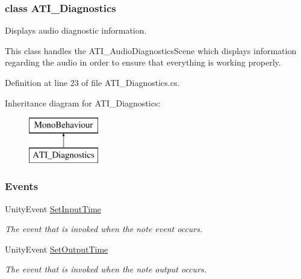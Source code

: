 \subsubsection{class A\+T\+I\+\_\+\+Diagnostics}
Displays audio diagnostic information. 

This class handles the A\+T\+I\+\_\+\+Audio\+Diagnostics\+Scene which displays information regarding the audio in order to ensure that everything is working properly. 

Definition at line 23 of file A\+T\+I\+\_\+\+Diagnostics.\+cs.

Inheritance diagram for A\+T\+I\+\_\+\+Diagnostics\+:\begin{figure}[H]
\begin{center}
\leavevmode
\includegraphics[height=2.000000cm]{group___audio_testing}
\end{center}
\end{figure}
\subsubsection*{Events}
\begin{DoxyCompactItemize}
\item 
Unity\+Event \hyperlink{group___audio_testing_a133561901c2aef535b2f3c098e55b959}{Set\+Input\+Time}
\begin{DoxyCompactList}\small\item\em The event that is invoked when the note event occurs. \end{DoxyCompactList}\item 
Unity\+Event \hyperlink{group___audio_testing_a6360e6098323b921b4a1b306914d06ef}{Set\+Output\+Time}
\begin{DoxyCompactList}\small\item\em The event that is invoked when the note output occurs. \end{DoxyCompactList}\end{DoxyCompactItemize}
